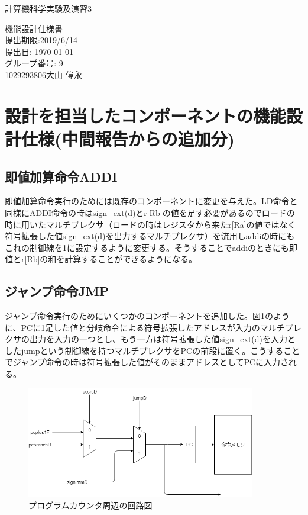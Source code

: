 \documentclass[a4paper,11pt,oneside,openany]{jsarticle}
\begin{document}
\begin{center}

  \vspace*{35mm}
  \huge 計算機科学実験及演習3 \par
  機能設計仕様書\\
  \vspace{90mm}
  \Large 提出期限:2019/6/14\\
   提出日: \today \\
  \vspace{15mm}
  \Large グループ番号: 9    \\
   1029293806\hspace{5mm}大山 偉永\par

  \vspace{10mm}
\end{center}
\clearpage
\addtocounter{page}{-1}

\newpage

\section{設計を担当したコンポーネントの機能設計仕様(中間報告からの追加分)}
\subsection{即値加算命令ADDI}
即値加算命令実行のためには既存のコンポーネントに変更を与えた。LD命令と同様にADDI命令の時はsign\_ext(d)とr[Rb]の値を足す必要があるのでロードの時に用いたマルチプレクサ（ロードの時はレジスタから来たr[Ra]の値ではなく符号拡張した値sign\_ext(d)を出力するマルチプレクサ）を流用しaddiの時にもこれの制御線を1に設定するように変更する。そうすることでaddiのときにも即値とr[Rb]の和を計算することができるようになる。

\subsection{ジャンプ命令JMP}
ジャンプ命令実行のためにいくつかのコンポーネントを追加した。図\ref{jump}のように、PCに1足した値と分岐命令による符号拡張したアドレスが入力のマルチプレクサの出力を入力の一つとし、もう一方は符号拡張した値sign\_ext(d)を入力としたjumpという制御線を持つマルチプレクサをPCの前段に置く。こうすることでジャンプ命令の時は符号拡張した値がそのままアドレスとしてPCに入力される。

\begin{figure}[h]
  \centering
  \includegraphics[width=10cm]{jump.png}
  \caption{プログラムカウンタ周辺の回路図}
  \label{jump}
\end{figure}
\end{document}
